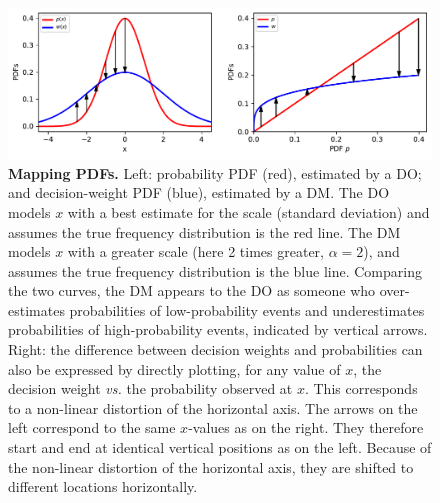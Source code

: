 \documentclass[a4paper, 12pt]{article}
\newcommand{\flabel}[1]{\label{fig:#1}}
\newcommand{\ND}{\mathcal{N}} %
\begin{document}
\begin{figure}[htb]
\centering
\includegraphics[width=\textwidth]{./figs/density_map.pdf}
\caption{{\bf Mapping PDFs.} Left: probability PDF (red), estimated by a DO; and decision-weight PDF (blue), estimated by a DM. The DO models $x$ with a best estimate for the scale (standard deviation) and assumes the true frequency distribution is the red line. The DM models $x$ with a greater scale (here 2 times greater, $\alpha=2$), and assumes the true frequency distribution is the blue line. Comparing the two curves, the DM appears to the DO as someone who over-estimates probabilities of low-probability events and underestimates probabilities of high-probability events, indicated by vertical arrows.
Right: the difference between decision weights and probabilities can also be expressed by directly plotting, for any value of $x$, the decision weight {\it vs.} the probability observed at $x$. This corresponds to a non-linear distortion of the horizontal axis. The arrows on the left correspond to the same $x$-values as on the right. They therefore start and end at identical vertical positions as on the left. Because of the non-linear distortion of the horizontal axis, they are shifted to different locations horizontally.}
\flabel{probability_dists}
\end{figure}
%
%
\end{document}
